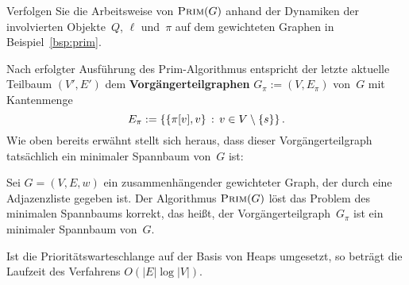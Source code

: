 \begin{aufg}
Verfolgen Sie die Arbeitsweise von $\mathop{\text{\textsc{Prim}}}(G)$ anhand der Dynamiken der involvierten Objekte~$Q$, $\ell$ und~$\pi$ auf dem gewichteten Graphen in Beispiel~\ref{bsp:prim}.
\end{aufg}

\begin{bem}
Nach erfolgter Ausführung des Prim-Algorithmus entspricht der letzte aktuelle Teilbaum $(V',E')$ dem \textbf{Vorgängerteilgraphen} $G_\pi := (V,E_\pi)$ von~$G$ mit Kantenmenge
\[
E_\pi := \left\{  \{\pi[v],v\} \,:\, v \in V \setminus \{s\} \right\}.
\]
Wie oben bereits erwähnt stellt sich heraus, dass dieser Vorgängerteilgraph tatsächlich ein minimaler Spannbaum von~$G$ ist:
\end{bem} 

\begin{thm}
\label{thm:prim-korrektheit}
Sei $G=(V,E,w)$ ein zusammenhängender gewichteter Graph, der durch eine Adjazenzliste gegeben ist. 
Der Algorithmus $\mathop{\text{\textsc{Prim}}}(G)$ löst das Problem des minimalen Spannbaums korrekt, das heißt, der Vorgängerteilgraph~$G_\pi$ ist ein minimaler Spannbaum von~$G$.

Ist die Prioritätswarteschlange auf der Basis von Heaps umgesetzt, so beträgt die Laufzeit des Verfahrens $O(|E| \log |V|)$. 
\end{thm}

